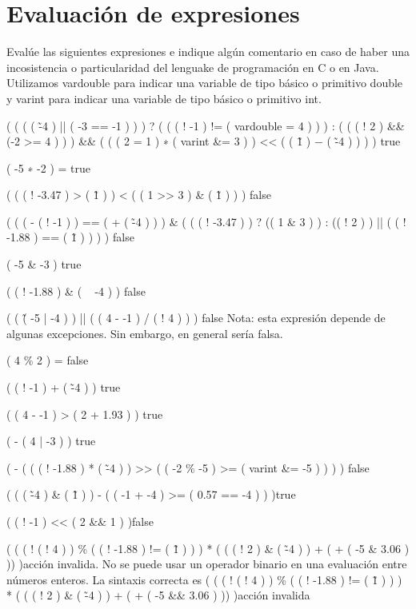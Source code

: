 \documentclass[12pt]{article}
\begin{document}
\section{Evaluación de expresiones}

Eval\'ue las siguientes expresiones e indique algún comentario en caso de haber una incosistencia o particularidad del lenguake de programaci\'on en C o en Java. Utilizamos vardouble para indicar una variable de tipo b\'asico o primitivo double y varint para indicar una variable de tipo b\'asico o primitivo int.

\item ( ( ( ( \~ -4 ) || ( -3 == -1 ) ) ) ? ( ( ( ! -1 ) != ( vardouble = 4 ) ) ) : ( ( ( ! 2 ) \&\& (-2 >= 4 ) ) ) \&\& ( ( ( 2 \!= 1 ) ∗ ( varint \&= 3 ) ) << ( ( \~ 1 ) − ( \~ -4 ) ) ) ) \longrightarrow true
\item ( -5 ∗ -2 ) = true
\item ( ( ( ! -3.47 ) > ( \~ 1 ) ) < ( ( 1 >> 3 ) \& ( \~ 1 ) ) ) \longrightarrow false
\item ( ( ( - ( ! -1 ) ) == ( + ( \~ -4 ) ) ) \& ( ( ( ! -3.47 ) ) ? (( 1 \& 3 ) ) : (( ! 2 ) ) || ( ( ! -1.88 ) == ( \~ 1 ) ) ) ) \longrightarrow false
\item ( -5 \& -3 ) \longrightarrow true
\item ( ( ! -1.88 ) \& ( ~ -4 ) ) \longrightarrow false
\item ( ( \~ ( -5 | -4 ) ) || ( ( 4 - -1 ) / ( ! 4 ) ) ) \longrightarrow false Nota: esta expresi\'on depende de algunas excepciones. Sin embargo, en general sería falsa.
\item ( 4 \% 2 )  = false
\item ( ( ! -1 ) + ( \~ -4 ) ) \longrightarrow true
\item ( ( 4 - -1 ) > ( 2 + 1.93 ) ) \longrightarrow true
\item ( - ( 4 | -3 ) ) \longrightarrow true
\item ( - ( ( ( ! -1.88 ) * ( \~ -4 ) ) >> ( ( -2 \% -5 ) >= ( varint \&= -5 ) ) ) ) \longrightarrow false
\item ( ( ( \~ -4 ) \& ( \~ 1 ) ) - ( ( -1 + -4 ) >= ( 0.57 == -4 ) ) )\longrightarrow true
\item ( ( ! -1 ) << ( 2 \&\& 1 ) )\longrightarrow false
\item ( ( ( ! ( ! 4 ) ) \% ( ( ! -1.88 ) != ( \~ 1 ) ) ) * ( ( ( ! 2 ) \& ( \~ -4 ) ) + ( + ( -5 \& 3.06 ) )) )\longrightarrow acci\'on invalida. No se puede usar un operador binario en una evaluación entre números enteros. La sintaxis correcta es ( ( ( ! ( ! 4 ) ) \% ( ( ! -1.88 ) != ( \~ 1 ) ) ) * ( ( ( ! 2 ) \& ( \~ -4 ) ) + ( + ( -5 \&\& 3.06 ) )) )\longrightarrow acci\'on invalida
\end{document}
